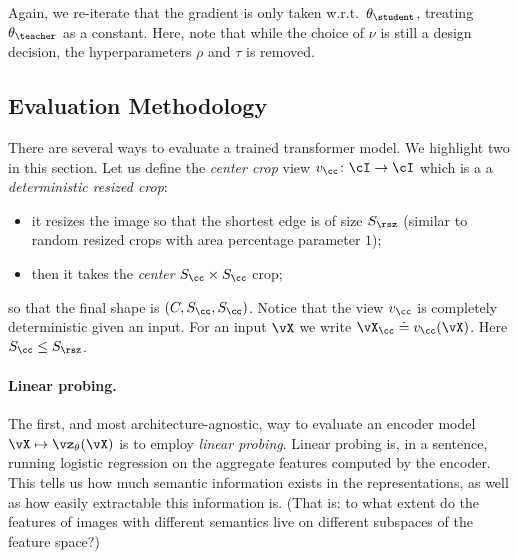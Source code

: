 \documentclass[../../book-main.tex]{subfiles}
\begin{document}
Again, we re-iterate that the gradient is only taken w.r.t.~\(\theta_{\student}\), treating \(\theta_{\teacher}\) as a constant. Here, note that while the choice of \(\nu\) is still a design decision, the hyperparameters \(\rho\) and \(\tau\) is removed.


\subsection{Evaluation Methodology}\label{sub:contrastive_learning_evals}
There are several ways to evaluate a trained transformer model. We highlight two in this section. Let us define the \textit{center crop} view \(v_{\cc} \colon \cI \to \cI\) which is a a \textit{deterministic resized crop}:
\begin{itemize}
    \item it resizes the image so that the shortest edge is of size \(S_{\rsz}\) (similar to random resized crops with area percentage parameter \(1\));
    \item then it takes the \textit{center} \(S_{\cc} \times S_{\cc}\) crop;
\end{itemize}
so that the final shape is \((C, S_{\cc}, S_{\cc})\). Notice that the view \(v_{\cc}\) is completely deterministic given an input. For an input \(\vX\) we write \(\vX_{\cc} \doteq v_{\cc}(\vX)\). Here \(S_{\cc} \leq S_{\rsz}\).


\paragraph{Linear probing.}

The first, and most architecture-agnostic, way to evaluate an encoder model \(\vX \mapsto \vz_{\theta}(\vX)\) is to employ \textit{linear probing}. Linear probing is, in a sentence, running logistic regression on the aggregate features computed by the encoder. This tells us how much semantic information exists in the representations, as well as how easily extractable this information is. (That is: to what extent do the features of images with different semantics live on different subspaces of the feature space?)
\end{document}
